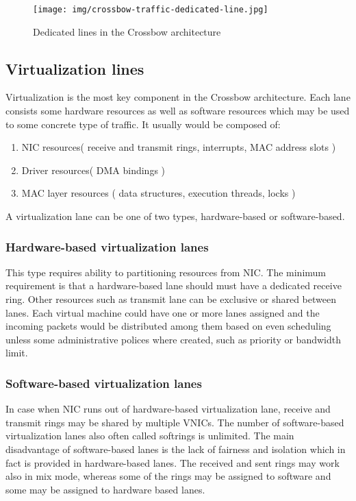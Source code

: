 \documentclass[11pt]{book}
\begin{document}
		\begin{figure}[H]
			\texttt{[image: img/crossbow-traffic-dedicated-line.jpg]}
			\caption{Dedicated lines in the Crossbow architecture}
		\end{figure}
		
		\subsection{Virtualization lines}

			Virtualization is the most key component in the Crossbow architecture. Each lane consists some hardware resources as well as software resources which may be 
			used to some concrete type of traffic. It usually would be composed of: 
			\begin{enumerate}
				\item{NIC resources( receive and transmit rings, interrupts, MAC address slots )}
				\item{Driver resources( DMA bindings )}
				\item{MAC layer resources ( data structures, execution threads, locks )}
			\end{enumerate}
			
			A virtualization lane can be one of two types, hardware-based or software-based.
			
			\subsubsection{Hardware-based virtualization lanes}
			
			This type requires ability to partitioning resources from NIC. The minimum requirement is that a hardware-based lane should must have a dedicated receive ring.
			Other resources such as transmit lane can be exclusive or shared between lanes. Each virtual machine could have one or more lanes assigned and the incoming packets
			would be distributed among them based on even scheduling unless some administrative polices where created, such as priority or bandwidth limit.		
			
			\subsubsection{Software-based virtualization lanes}
			
			In case when NIC runs out of hardware-based virtualization lane, receive and transmit rings may be shared by multiple VNICs. The number of software-based virtualization 
			lanes also often called softrings is unlimited. The main disadvantage of software-based lanes is the lack of fairness and isolation which in fact is provided in hardware-based
			lanes. The received and sent rings may work also in mix mode, whereas some of the rings may be assigned to software and some may be assigned to hardware based lanes.	
			
\end{document}
